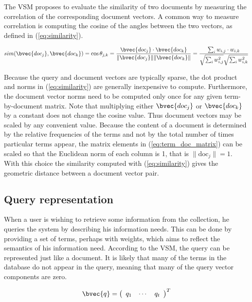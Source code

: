 The VSM proposes to evaluate the similarity of two documents by measuring the correlation of the corresponding document vectors. A common way to measure correlation is computing the cosine of the angles between the two vectors, as defined in (\ref{eq:similarity}).

\begin{equation}\label{eq:similarity}
 sim(\bvec{doc_j},\bvec{doc_k}) = \cos \theta_{j,k} = \frac{\bvec{doc_j} \cdot \bvec{doc_k}}{\|\bvec{doc_j}\| \|\bvec{doc_k}\|} = \frac{\sum_i w_{i,j} \cdot w_{i,k}}{\sqrt{\sum_i w_{i,j}^2 } \sqrt{\sum_i w_{i,k}^2 }  }
\end{equation}

Because the query and document vectors are typically sparse, the dot product and norms in (\ref{eq:similarity}) are generally inexpensive to compute. Furthermore, the document vector norms need to be computed only once for any given term-by-document matrix. Note that multiplying either $\bvec{doc_j}$ or $\bvec{doc_k}$ by a constant does not change the cosine value. Thus document vectors may be scaled by any convenient value. Because the content of a document is determined by the relative frequencies of the terms and not by the total number of times particular terms appear, the matrix elements in (\ref{eq:term_doc_matrix}) can be scaled so that the Euclidean norm of each column is 1, that is $\|\mbox{doc}_{j}\| = 1$. With this choice the similarity computed with (\ref{eq:similarity}) gives the geometric distance between a document vector pair.

\subsection{Query representation}
When a user is wishing to retrieve some information from the collection, he queries the system by describing his information needs. This can be done by providing a set of terms, perhaps with weights, which aims to reflect the semantics of his information need. According to the VSM, the query can be represented just like a document. It is likely that many of the terms in the database do not appear in the query, meaning that many of the query vector components are zero.

\begin{equation}
\bvec{q} = \left(
\begin{array}{ccc}
   q_1 & \cdots & q_t
\end{array}
\right)^T
\end{equation}

